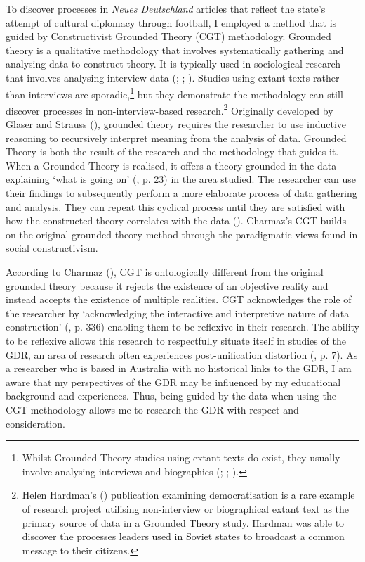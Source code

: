 To discover processes in \textit{Neues Deutschland} articles that reflect the state’s attempt of cultural diplomacy through football, I employed a method that is guided by Constructivist Grounded Theory (CGT) methodology. Grounded theory is a qualitative methodology that involves systematically gathering and analysing data to construct theory. It is typically used in sociological research that involves analysing interview data (\cite{oktay2012}; \cite{bryantcharmaz2007}; \cite{bryantcharmaz2019}). Studies using extant texts rather than interviews are sporadic,\footnote{Whilst Grounded Theory studies using extant texts do exist, they usually involve analysing interviews and biographies (\cite{plummer1983}; \cite{yarwood-rossjack2015}; \cite{ravenek2017}).}  but they demonstrate the methodology can still discover processes in non-interview-based research.\footnote{Helen Hardman’s (\citeyear{hardman2013}) publication examining democratisation is a rare example of research project utilising non-interview or biographical extant text as the primary source of data in a Grounded Theory study. Hardman was able to discover the processes leaders used in Soviet states to broadcast a common message to their citizens.}  Originally developed by Glaser and Strauss (\citeyear{glaserstrauss1977}), grounded theory requires the researcher to use inductive reasoning to recursively interpret meaning from the analysis of data. Grounded Theory is both the result of the research and the methodology that guides it. When a Grounded Theory is realised, it offers a theory grounded in the data explaining ‘what is going on’ (\cite{glaserstrauss1977}, p. 23) in the area studied. The researcher can use their findings to subsequently perform a more elaborate process of data gathering and analysis. They can repeat this cyclical process until they are satisfied with how the constructed theory correlates with the data (\cite{glaserstrauss1977}). Charmaz’s CGT builds on the original grounded theory method through the paradigmatic views found in social constructivism.

According to Charmaz (\citeyear{charmaz2014}), CGT is ontologically different from the original grounded theory because it rejects the existence of an objective reality and instead accepts the existence of multiple realities. CGT acknowledges the role of the researcher by ‘acknowledging the interactive and interpretive nature of data construction’ (\cite{inabakakai2019}, p. 336) enabling them to be reflexive in their research. The ability to be reflexive allows this research to respectfully situate itself in studies of the GDR, an area of research often experiences post-unification distortion (\cite{fullbrook1995}, p. 7). As a researcher who is based in Australia with no historical links to the GDR, I am aware that my perspectives of the GDR may be influenced by my educational background and experiences. Thus, being guided by the data when using the CGT methodology allows me to research the GDR with respect and consideration.

